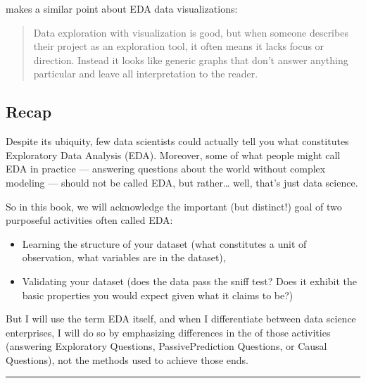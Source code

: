 \documentclass[letterpaper,10pt,english]{jupyterBook}
\begin{document}
\sphinxAtStartPar
{} makes a similar point about EDA data visualizations:
\begin{quote}

\sphinxAtStartPar
Data exploration with visualization is good, but when someone describes their project as an exploration tool, it often means it lacks focus or direction. Instead it looks like generic graphs that don’t answer anything particular and leave all interpretation to the reader.
\end{quote}


\subsection{Recap}
\label{\detokenize{30_questions/07_eda:recap}}
\sphinxAtStartPar
Despite its ubiquity, few data scientists could actually tell you what constitutes Exploratory Data Analysis (EDA). Moreover, some of what people might call EDA in practice — answering questions about the world without complex modeling — should not be called EDA, but rather… well, that’s just data science.

\sphinxAtStartPar
So in this book, we will acknowledge the important (but distinct!) goal of two purposeful activities often called EDA:
\begin{itemize}
\item {} 
\sphinxAtStartPar
Learning the structure of your dataset (what constitutes a unit of observation, what variables are in the dataset),

\item {} 
\sphinxAtStartPar
Validating your dataset (does the data pass the sniff test? Does it exhibit the basic properties you would expect given what it claims to be?)

\end{itemize}

\sphinxAtStartPar
But I will  use the term EDA itself, and when I differentiate between data science enterprises, I will do so by emphasizing differences in the  of those activities (answering Exploratory Questions, Passive\sphinxhyphen{}Prediction Questions, or Causal Questions), not the methods used to achieve those ends.


\bigskip\hrule\bigskip


\sphinxstepscope
\end{document}
